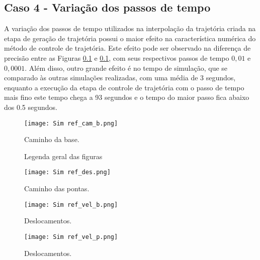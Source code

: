 \subsection{Caso 4 - Variação dos passos de tempo}
A variação dos passos de tempo utilizados na interpolação da trajetória criada na etapa de geração de trajetória possui o maior efeito na característica numérica do método de controle de trajetória. Este efeito pode ser observado na diferença de precisão entre as Figuras \ref{} e \ref{}, com seus respectivos passos de tempo \(0,01\) e \(0,0001\). Além disso, outro grande efeito é no tempo de simulação, que se comparado às outras simulações realizadas, com uma média de 3 segundos, enquanto a execução da etapa de controle de trajetória com o passo de tempo mais fino este tempo chega a 93 segundos e o tempo do maior passo fica abaixo dos 0.5 segundos.

\begin{figure}[H]
    \centering
    \caption{Caminho da base.}
    \texttt{[image: Sim ref\_cam\_b.png]}

    \label{fig:ref_cam_b}
\end{figure}

\begin{figure}[H]
    \centering
    \hfill
    \caption{Legenda geral das figuras}
    \label{fig:ref_cam_p_s}
\end{figure}

\begin{figure}[H]
    \centering
    \caption{Caminho das pontas.}
    \texttt{[image: Sim ref\_des.png]}

    \label{fig:ref_des}
\end{figure}

\begin{figure}[H]
    \centering
    \caption{Deslocamentos.}
    \texttt{[image: Sim ref\_vel\_b.png]}

    \label{fig:ref_vel_b}
\end{figure}

\begin{figure}[H]
    \centering
    \caption{Deslocamentos.}
    \texttt{[image: Sim ref\_vel\_p.png]}

    \label{fig:ref_vel_p}
\end{figure}

